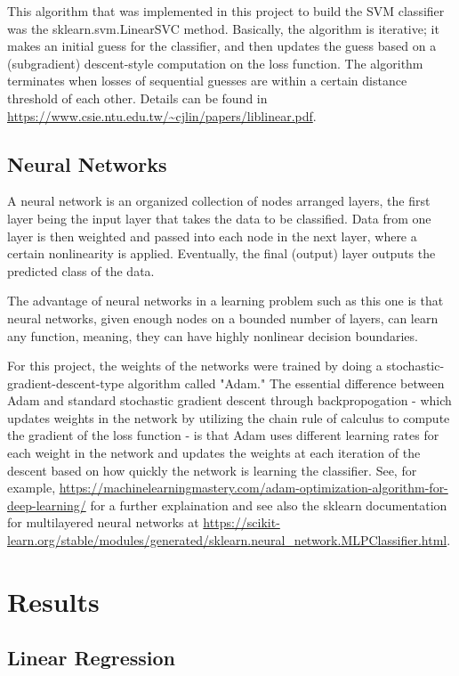 \documentclass{article}
\begin{document}
This algorithm that was implemented in this project to build the SVM classifier was the sklearn.svm.LinearSVC method. Basically, the algorithm is iterative; it makes an initial guess for the classifier, and then updates the guess based on a (subgradient) descent-style computation on the loss function. The algorithm terminates when losses of sequential guesses are within a certain distance threshold of each other. Details can be found in \url{https://www.csie.ntu.edu.tw/~cjlin/papers/liblinear.pdf}.

\subsection{Neural Networks} A neural network is an organized collection of nodes arranged layers, the first layer being the input layer that takes the data to be classified. Data from one layer is then weighted and passed into each node in the next layer, where a certain nonlinearity is applied. Eventually, the final (output) layer outputs the predicted class of the data. 

The advantage of neural networks in a learning problem such as this one is that neural networks, given enough nodes on a bounded number of layers, can learn any function, meaning, they can have highly nonlinear decision boundaries. 

For this project, the weights of the networks were trained by doing a stochastic-gradient-descent-type algorithm called "Adam." The essential difference between Adam and standard stochastic gradient descent through backpropogation - which updates weights in the network by utilizing the chain rule of calculus to compute the gradient of the loss function -  is that Adam uses different learning rates for each weight in the network and updates the weights at each iteration of the descent based on how quickly the network is learning the classifier. See, for example, \url{https://machinelearningmastery.com/adam-optimization-algorithm-for-deep-learning/} for a further explaination and see also the sklearn documentation for multilayered neural networks at \url{https://scikit-learn.org/stable/modules/generated/sklearn.neural_network.MLPClassifier.html}.

\section{Results}

\subsection{Linear Regression}
\end{document}
